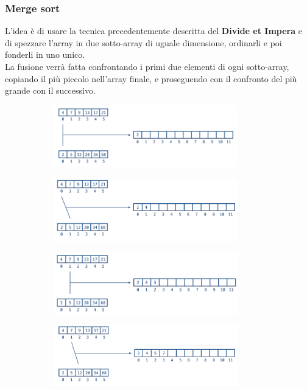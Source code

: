 \subsubsection{Merge sort}
L'idea è di usare la tecnica precedentemente descritta del \textbf{Divide et Impera} e di spezzare l'array in due sotto-array di uguale dimensione, ordinarli e poi fonderli in uno unico. \\
La fusione verrà fatta confrontando i primi due elementi di ogni sotto-array, copiando il più piccolo nell'array finale, e proseguendo con il confronto del più grande con il successivo.
\begin{figure}[h]
	\begin{subfigure}{.5\textwidth}
		\centering
		\includegraphics[width=8cm]{images/mergesort_1.png}
	\end{subfigure}
	\begin{subfigure}{.5\textwidth}
		\centering
		\includegraphics[width=8cm]{images/mergesort_2.png}
	\end{subfigure}
\end{figure}
\begin{figure}[h]
	\begin{subfigure}{.5\textwidth}
		\centering
		\includegraphics[width=8cm]{images/mergesort_3.png}
	\end{subfigure}
	\begin{subfigure}{.5\textwidth}
		\centering
		\includegraphics[width=8cm]{images/mergesort_4.png}
	\end{subfigure}
\end{figure}

